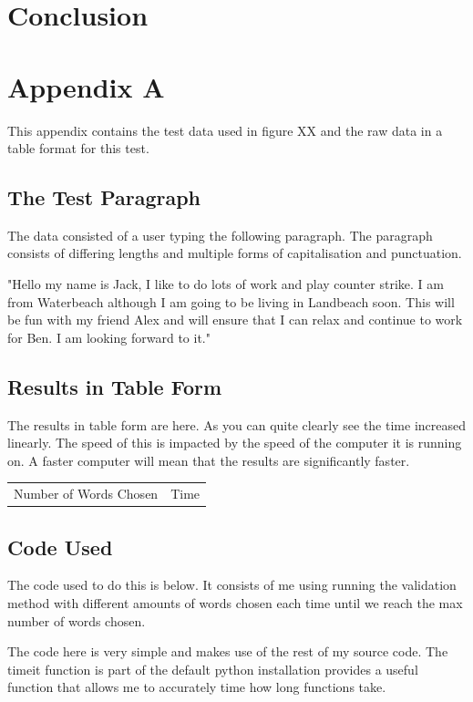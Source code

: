 \documentclass[10pt,a4paper]{report}
\begin{document}
\chapter{Conclusion}


\chapter*{Appendix A}

This appendix contains the test data used in figure XX and the raw data in a table format for this test.

\section*{The Test Paragraph}
The data consisted of a user typing the following paragraph. The paragraph consists of differing lengths and multiple forms of capitalisation and punctuation.

"Hello my name is Jack, I like to do lots of work and play counter strike. I am from Waterbeach although I am going to be living in Landbeach soon. This will be fun with my friend Alex and will ensure that I can relax and continue to work for Ben. I am looking forward to it."

\section*{Results in Table Form}
The results in table form are here. As you can quite clearly see the time increased linearly. The speed of this is impacted by the speed of the computer it is running on. A faster computer will mean that the results are significantly faster.

\begin{center}
	\begin{tabular}{|c|c|}
		Number of Words Chosen & Time \\
	\end{tabular}
\end{center}

\section*{Code Used}
The code used to do this is below. It consists of me using running the validation method with different amounts of words chosen each time until we reach the max number of words chosen.

The code here is very simple and makes use of the rest of my source code. The timeit function\cite{pythonsoftwarefoundation_2022} is part of the default python installation provides a useful function that allows me to accurately time how long functions take. 
\end{document}
